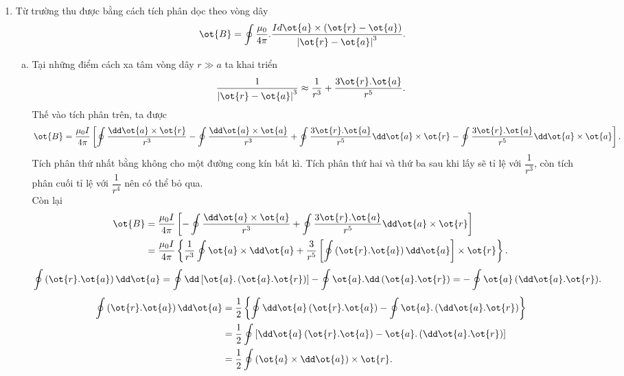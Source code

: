 \begin{loigiai}
    \begin{enumerate}[1)]
        \item Từ trường thu được bằng cách tích phân dọc theo vòng dây 
        \[\ot{B}=\oint{\dfrac{{{\mu }_{0}}}{4\pi }.\dfrac{Id\ot{a}\times \left( \ot{r}-\ot{a} \right)}{{{\left| \ot{r}-\ot{a} \right|}^{3}}}}.\]
        \begin{enumerate}[a)]
            \item Tại những điểm cách xa tâm vòng dây $r \gg a$ ta khai triển 
            \[\dfrac{1}{{{\left| \ot{r}-\ot{a} \right|}^{3}}}\approx \dfrac{1}{{{r}^{3}}}+\dfrac{3\ot{r}.\ot{a}}{{{r}^{5}}}.\]
            Thế vào tích phân trên, ta được
            \[\ot{B}=\dfrac{{{\mu }_{0}}I}{4\pi }\left[ \oint{\dfrac{\dd\ot{a}\times \ot{r}}{{{r}^{3}}}}-\oint{\dfrac{\dd\ot{a}\times \ot{a}}{{{r}^{3}}}}+\oint{\dfrac{3\ot{r}.\ot{a}}{{{r}^{5}}}\dd\ot{a}\times \ot{r}}-\oint{\dfrac{3\ot{r}.\ot{a}}{{{r}^{5}}}\dd\ot{a}\times \ot{a}} \right].\]
            Tích phân thứ nhất bằng không cho một đường cong kín bất kì. Tích phân thứ hai và thứ ba sau khi lấy sẽ tỉ lệ với $\dfrac{1}{{{r}^{3}}}$, còn tích phân cuối tỉ lệ với $\dfrac{1}{{{r}^{4}}}$ nên có thể bỏ qua.\\
            Còn lại 
            \[\begin{aligned}
                \ot{B}&=\dfrac{{{\mu }_{0}}I}{4\pi }\left[ -\oint{\dfrac{\dd\ot{a}\times \ot{a}}{{{r}^{3}}}}+\oint{\dfrac{3\ot{r}.\ot{a}}{{{r}^{5}}}\dd\ot{a}\times \ot{r}} \right]\\
                &=\dfrac{{{\mu }_{0}}I}{4\pi }\left\{ \dfrac{1}{{{r}^{3}}}\oint{\ot{a}\times \dd\ot{a}}+\dfrac{3}{{{r}^{5}}}\left[ \oint{\left( \ot{r}.\ot{a} \right)\dd\ot{a}} \right]\times \ot{r} \right\}.
            \end{aligned} \]
            \[\oint{\left( \ot{r}.\ot{a} \right)\dd\ot{a}}=\oint{\dd\left[ \ot{a}.\left( \ot{a}.\ot{r} \right) \right]}-\oint{\ot{a}.\dd\left( \ot{a}.\ot{r} \right)}=-\oint{\ot{a}\left( \dd\ot{a}.\ot{r} \right)}.\]
            \[\begin{aligned}
                \oint{\left( \ot{r}.\ot{a} \right)\dd\ot{a}}&=\dfrac{1}{2}\left\{ \oint{\dd\ot{a}\left( \ot{r}.\ot{a} \right)}-\oint{\ot{a}.\left(\dd\ot{a}.\ot{r} \right)} \right\}\\
                &=\dfrac{1}{2}\oint{\left[\dd\ot{a}\left( \ot{r}.\ot{a} \right)-\ot{a}.\left(\dd\ot{a}.\ot{r} \right) \right]}\\
                &=\dfrac{1}{2}\oint{\left( \ot{a}\times \dd\ot{a} \right)\times \ot{r}}.

\end{aligned}\]
\end{enumerate}
\end{enumerate}
\end{loigiai}
